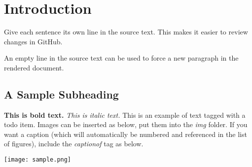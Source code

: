 \newpage
\section{Introduction}


Give each sentence its own line in the source text.
This makes it easier to review changes in GitHub.

An empty line in the source text can be used to force a new paragraph in the rendered document.

\subsection{A Sample Subheading}

\textbf{This is bold text.}
\emph{This is italic text.}
 This is an example of text tagged with a todo item.
Images can be inserted as below, put them into the \emph{img} folder.
If you want a caption (which will automatically be numbered and referenced in the list of figures), include the \emph{captionof} tag as below.

\begin{center}
	\texttt{[image: sample.png]}
\end{center}
